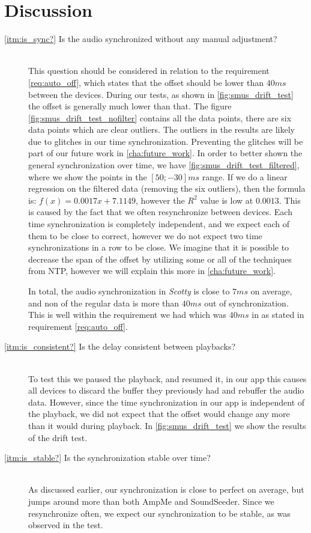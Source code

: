 \section{Discussion}
\begin{description}
    \item[\ref{itm:is_sync?} Is the audio synchronized without any manual adjustment?] \hfill \\
        This question should be considered in relation to the requirement \vref{req:auto_off}, which states that the offset should be lower than $40 ms$ between the devices.
        During our tests, as shown in \vref{fig:smus_drift_test} the offset is generally much lower than that.
        The figure \vref{fig:smus_drift_test_nofilter} contains all the data points, there are six data points which are clear outliers.
        The outliers in the results are likely due to glitches in our time synchronization.
        Preventing the glitches will be part of our future work in \vref{cha:future_work}.
        In order to better shown the general synchronization over time, we have \vref{fig:smus_drift_test_filtered}, where we show the points in the $[50;-30] ms$ range.
        If we do a linear regression on the filtered data (removing the six outliers), then the formula is: $f(x) = 0.0017x + 7.1149$, however the $R^2$ value is low at $0.0013$.
        This is caused by the fact that we often resynchronize between devices.
        Each time synchronization is completely independent, and we expect each of them to be close to correct, however we do not expect two time synchronizations in a row to be close.
        We imagine that it is possible to decrease the span of the offset by utilizing some or all of the techniques from \ac{NTP}, however we will explain this more in \vref{cha:future_work}.

        In total, the audio synchronization in \textit{Scotty} is close to $7 ms$ on average, and non of the regular data is more than $40 ms$ out of synchronization.
        This is well within the requirement we had which was $40 ms$ in as stated in requirement \ref{req:auto_off}.

    \item[\ref{itm:is_consistent?} Is the delay consistent between playbacks?] \hfill \\
        To test this we paused the playback, and resumed it, in our app this causes all devices to discard the buffer they previously had and rebuffer the audio data.
        However, since the time synchronization in our app is independent of the playback, we did not expect that the offset would change any more than it would during playback.
        In \vref{fig:smus_drift_test} we show the results of the drift test.

    \item[\ref{itm:is_stable?} Is the synchronization stable over time?] \hfill \\
        As discussed earlier, our synchronization is close to perfect on average, but jumps around more than both AmpMe and SoundSeeder.
        Since we resynchronize often, we expect our synchronization to be stable, as was observed in the test.
\end{description}
